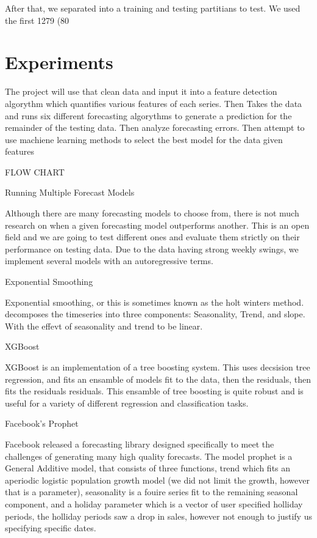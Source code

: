 \documentclass[12pt,twocolumn,letterpaper]{article}
\begin{document}
After that, we separated into a training and testing partitians to test. We used the first 1279 (80%

\section{Experiments}

The project will use that clean data and input it into a feature detection algorythm which quantifies various features of each series. Then Takes the data and runs six different forecasting algorythms to generate a prediction for the remainder of the testing data. Then analyze forecasting errors. Then attempt to use machiene learning methods to select the best model for the data given features

FLOW CHART

Running Multiple Forecast Models

Although there are many forecasting models to choose from, there is not much research on when a given forecasting model outperforms another. This is an open field and we are going to test different ones and evaluate them strictly on their performance on testing data. Due to the data having strong weekly swings, we implement several models with an autoregressive terms.

 Exponential Smoothing

Exponential smoothing, or this is sometimes known as the holt winters method. decomposes the timeseries into three components: Seasonality, Trend, and slope. With the effevt of seasonality and trend to be linear.

XGBoost

XGBoost is an implementation of a tree boosting system. This uses decsision tree regression, and fits an ensamble of models fit to the data, then the residuals, then fits the residuals residuals. This ensamble of tree boosting is quite robust and is useful for a variety of different regression and classification tasks.

Facebook's Prophet

Facebook released a forecasting library designed specifically to meet the challenges of generating many high quality forecasts. The model prophet is a General Additive model, that consists of three functions, trend which fits an aperiodic logistic population growth model (we did not limit the growth, however that is a parameter), seasonality is a fouire series fit to the remaining seasonal component, and a holiday parameter which is a vector of user specified holliday periods, the holliday periods saw a drop in sales, however not enough to justify us specifying specific dates. 
\end{document}
